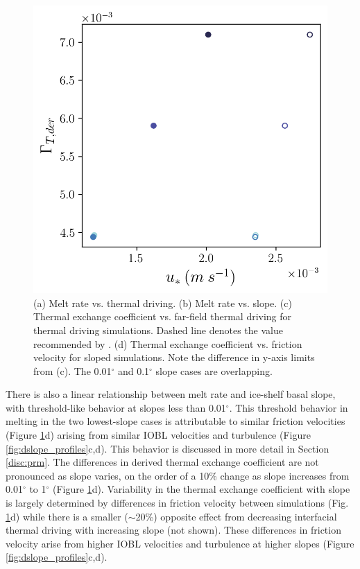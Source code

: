 \documentclass[draft]{agujournal2019}
\begin{document}
\begin{figure}[h!]
    \begin{minipage}{0.5\textwidth}
        \includegraphics[trim={0 0 0 0cm},clip,width=\textwidth]{Figures/gammaT_us_cmp_dslope_43h_tav13h.png}
    \end{minipage}
    \caption{(a) Melt rate vs. thermal driving. (b) Melt rate vs. slope. (c) Thermal exchange coefficient vs. far-field thermal driving for thermal driving simulations. Dashed line denotes the value recommended by . (d) Thermal exchange coefficient vs. friction velocity for sloped simulations. Note the difference in y-axis limits from (c). The 0.01$^{\circ}$ and 0.1$^{\circ}$ slope cases are overlapping.}
    \label{fig:melt_sensitivity}
\end{figure}

There is also a linear relationship between melt rate and ice-shelf basal slope, with threshold-like behavior at slopes less than 0.01$^{\circ}$. This threshold behavior in melting in the two lowest-slope cases is attributable to similar friction velocities (Figure \ref{fig:melt_sensitivity}d) arising from similar IOBL velocities and turbulence  (Figure \ref{fig:dslope_profiles}c,d). This behavior is discussed in more detail in Section \ref{disc:prm}. The differences in derived thermal exchange coefficient are not pronounced as slope varies, on the order of a 10\% change as slope increases from 0.01$^{\circ}$ to 1$^{\circ}$ (Figure \ref{fig:melt_sensitivity}d). Variability in the thermal exchange coefficient with slope is largely determined by differences in friction velocity between simulations (Fig. \ref{fig:melt_sensitivity}d) while there is a smaller ($\sim$20\%) opposite effect from decreasing interfacial thermal driving with increasing slope (not shown). These differences in friction velocity arise from higher IOBL velocities and turbulence at higher slopes (Figure \ref{fig:dslope_profiles}c,d). 
\end{document}
